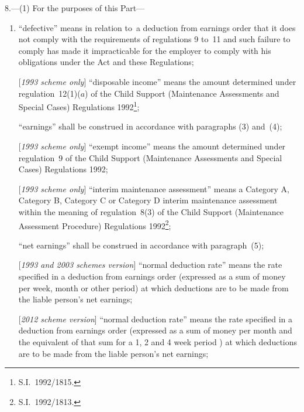 \documentclass[12pt,a4paper]{article}
\begin{document}
8.—(1) For the purposes of this Part—
\begin{enumerate}\item[]
“defective” means in relation to~a deduction from earnings order that it does not comply with the requirements of regulations 9 to~11 and such failure to comply has made it impracticable for the employer to comply with his obligations under the Act and these Regulations;

\begin{sloppypar}
[\emph{1993 scheme only}] “disposable income” means the amount determined under 
regulation~12(1)($a$)  %
of the Child Support (Maintenance Assessments and Special Cases) Regulations 1992\footnote{\frenchspacing S.I.~1992/1815.};
\end{sloppypar}

“earnings” shall be construed in accordance with paragraphs (3) and~(4);

[\emph{1993 scheme only}] “exempt income” means the amount determined under regulation~9 of the Child Support (Maintenance Assessments and Special Cases) Regulations 1992;

[\emph{1993 scheme only}] “interim maintenance assessment” means a Category A, Category B, Category C or Category D interim maintenance assessment within the meaning of 
regulation~8(3)  %
of the Child Support (Maintenance Assessment Procedure) Regulations 1992\footnote{\frenchspacing S.I.~1992/1813.};

“net earnings” shall be construed in accordance with paragraph~(5);

[\emph{1993 and 2003 schemes version}] “normal deduction rate” means the rate specified in a deduction from earnings order (expressed as a sum of money per week, month or other period) at which deductions are to be made from the liable person’s net earnings;

[\emph{2012 scheme version}] “normal deduction rate” means the rate specified in a deduction from earnings order (expressed as a sum of money per %
month and the equivalent of that sum for a 1, 2 and 4 week period%
) at which deductions are to be made from the liable person’s net earnings;


\end{enumerate}
\end{document}

